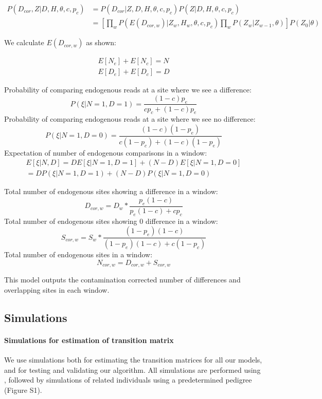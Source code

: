\documentclass[12pt, letterpaper]{article}
\begin{document}
\begin{align}
    P(D_{cor},Z|D,H,\theta,c,p_c) &= P(D_{cor}|Z,D,H,\theta,c,p_c) P(Z|D,H,\theta,c,p_c)\nonumber\\
    &= [\prod_{w} P(E(D_{cor,w})|Z_w, H_w, \theta,c,p_c) \prod_{w} P(Z_w|Z_{w-1}, \theta)] P(Z_0| \theta)
\end{align}

We calculate $E(D_{cor,w})$ as shown:

\begin{align}
    E[N_e] + E[N_c] = N\\
    E[D_e] + E[D_c] = D
\end{align}

Probability of comparing endogenous reads at a site where we see a difference:
$$P(\xi | N = 1,D = 1)=\frac{(1-c) p_e}{c p_c + (1-c) p_e} $$
Probability of comparing endogenous reads at a site where we see no difference:
$$P(\xi | N = 1,D = 0)=\frac{(1-c)(1-p_e)}{c (1-p_c) + (1-c) (1-p_e)} $$
Expectation of number of endogenous comparisons in a window:
\begin{align}
    E[\xi | N, D] = D E[\xi | N=1, D=1] + (N-D) E[\xi | N=1, D=0]\\
    = D P(\xi | N=1, D=1) + (N-D) P(\xi | N=1, D=0)
\end{align}



Total number of endogenous sites showing a difference in a window: 
$$D_{cor,w} = D_w* \frac{p_e(1-c)}{p_e(1-c) + c p_c} $$
Total number of endogenous sites showing 0 difference in a window: 
$$S_{cor,w} = S_w* \frac{(1-p_e)(1-c)}{(1-p_e)(1-c) + c (1-p_c)} $$
Total number of endogenous sites in a window:
$$N_{cor,w} = D_{cor,w} + S_{cor,w}$$

This model outputs the contamination corrected number of differences and overlapping sites in each window.

\subsection{Simulations}

\paragraph{ Simulations for estimation of transition matrix}
We use simulations both for estimating the transition matrices for all our models, and for testing and validating our algorithm. All simulations are performed using  \cite{kelleher_efficient_2016}, followed by simulations of related individuals using a predetermined pedigree (Figure S1).
\end{document}

